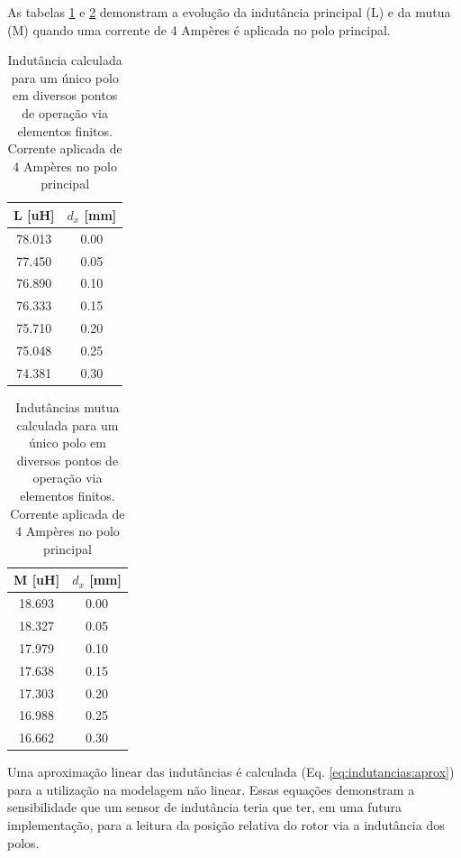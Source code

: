 As tabelas \ref{tab:dinamica:indutancia} e \ref{tab:dinamica:indutancia:mutua} demonstram a evolução da indutância principal (L) e da mutua (M) quando uma corrente de 4 Ampères é aplicada no polo principal. 

\begin{table}[ht!]
	\centering
	\begin{tabular}{c c}
        L [uH]  & $d_x$ [mm] \\
        \hline \hline               
        78.013 & 0.00 \\
        77.450 & 0.05 \\
        76.890 & 0.10 \\
        76.333 & 0.15 \\
        75.710 & 0.20 \\
        75.048 & 0.25 \\
        74.381 & 0.30       
	\end{tabular} 
	\caption{Indutância calculada para um único polo em diversos pontos de operação via elementos finitos. Corrente aplicada de 4 Ampères no polo principal}
	\label{tab:dinamica:indutancia} 
\end{table} 

\begin{table}[ht!]
	\centering
	\begin{tabular}{c c}
        M [uH]  & $d_x$ [mm] \\
        \hline \hline               
         18.693 & 0.00 \\
         18.327 & 0.05 \\
         17.979 & 0.10 \\
         17.638 & 0.15 \\
         17.303 & 0.20 \\
         16.988 & 0.25 \\
         16.662 & 0.30       
	\end{tabular} 
	\caption{Indutâncias mutua calculada para um único polo em diversos pontos de operação via elementos finitos. Corrente aplicada de 4 Ampères no polo principal}
	\label{tab:dinamica:indutancia:mutua} 
\end{table} 

Uma aproximação linear das indutâncias é calculada (Eq. \ref{eq:indutancias:aprox}) para a utilização na modelagem não linear. Essas equações demonstram a sensibilidade que um sensor de indutância teria que ter, em uma futura implementação, para a leitura da posição relativa do rotor via a indutância dos polos.

